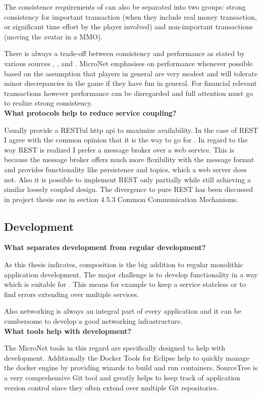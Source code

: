 The consistence requirements of \ogs{} can also be separated into two groups:
strong consistency for important transaction (when they include real money
transaction, or significant time effort by the player involved) and
non-important transactions (moving the avatar in a MMO).

There is always a trade-off between consistency and performance as stated by
various sources \cite{wada2011data}, \cite{olston2000offering}, and
\cite{franklin1997transactional}. MicroNet emphasises on performance whenever
possible based on the assumption that players in general are very modest and
will tolerate minor discrepancies in the game if they have fun in general. For
financial relevant transactions however performance can be disregarded and full
attention must go to realize strong consistency.\\

\noindent
\textbf{What protocols help to reduce service coupling?}

Usually \mss{} provide a RESTful \gls{http} \gls{api} to maximize availability.
In the case of REST I agree with the common opinion that it is the way to go for
\mss{}. In regard to the way REST is realized I prefer a message broker over a
web service. This is because the message broker offers much more flexibility with
the message format and provides functionality like persistence and topics, which
a web server does not. Also it is possible to implement REST only partially
while still achieving a similar loosely coupled design. The divergence to pure
REST has been discussed in project thesis one \cite{biedermann2015project1} in
section 4.5.3 Common Communication Mechanisms.\\

\subsection{\ms{} Development}

\noindent
\textbf{What separates \ms{} development from regular development?}

As this thesis indicates, \ms{} composition is the big addition to regular
monolithic application development. The major challenge is to develop
functionality in a way which is suitable for \mss{}. This means for example to
keep a service stateless or to find errors extending over multiple services. 

Also networking is always an integral part of every \ms{} application and it
can be cumbersome to develop a good networking infrastructure.\\

\noindent
\textbf{What tools help with \ms{} development?}

The MicroNet tools in this regard are specifically designed to help with \ms{}
development. Additionally the Docker Tools for Eclipse help to quickly manage
the docker engine by providing wizards to build and run containers. SourceTree
is a very comprehensive Git tool and greatly helps to keep track of \ms{}
application version control since they often extend over multiple Git
repositories.

